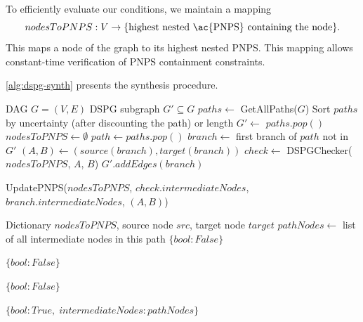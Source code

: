 To efficiently evaluate our conditions, we maintain a mapping
\[
nodesToPNPS : V \rightarrow \{\text{highest nested  \ac{PNPS} containing the node}\}.
\]
This maps a node of the graph to its highest nested  \ac{PNPS}. This mapping allows constant-time verification of \ac{PNPS} containment constraints.


\cref{alg:dspg-synth} presents the synthesis procedure.
\begin{algorithm}[H]
\caption{Optimized \ac{DSPG} Synthesis}
\label{alg:dspg-synth}
\begin{algorithmic}[1]
\Require \ac{DAG} $G = (V,E)$
\Ensure \ac{DSPG} subgraph $G' \subseteq G$
\State $paths \gets$ GetAllPaths($G$)
\State Sort $paths$ by uncertainty (after discounting the path) or length
\State $G' \gets$ $paths.pop()$ 
\State $nodesToPNPS \gets \emptyset$
    \State $path \gets paths.pop()$
    \State $branch \gets$ first branch of $path$ not in $G'$
    \State $(A,B) \gets (source(branch), target(branch))$
    \State $check \gets$ DSPGChecker($nodesToPNPS$, $A$, $B$)
        \State $G'.addEdges(branch)$

        \State UpdatePNPS($nodesToPNPS$, $check.intermediateNodes$,$branch.intermediateNodes$, $(A,B)$)

    \EndIf
\EndWhile
\end{algorithmic}
\end{algorithm}

\begin{algorithm}
\caption{\ac{DSPG}Checker}
\begin{algorithmic}[1]
\Require Dictionary $\textit{nodesToPNPS}$, source node $src$, target node $target$
    \State $pathNodes \gets$ list of all intermediate nodes in this path
\Else
    \State \Return $\{bool: False\}$
\EndIf

        \State \Return $\{bool: False\}$
    \EndIf
\EndIf

        \State \Return $\{bool: False\}$
    \EndIf
\EndIf

\State \Return $\{bool: True,\; intermediateNodes: pathNodes\}$
\end{algorithmic}
\end{algorithm}

